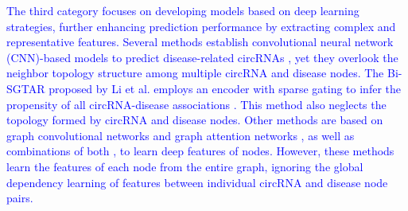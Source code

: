 \documentclass{bioinfo}
\begin{document}
\begin{methods}
\textcolor{blue}{The third category focuses on developing models based on deep learning strategies, further enhancing prediction performance by extracting complex and representative features. Several methods establish convolutional neural network (CNN)-based models to predict disease-related circRNAs \cite{tian2024mamlcda, wang2020efficient, lu2020improving}, yet they overlook the neighbor topology structure among multiple circRNA and disease nodes. The Bi-SGTAR proposed by Li et al. employs an encoder with sparse gating to infer the propensity of all circRNA-disease associations \cite{li2024bi}. This method also neglects the topology formed by circRNA and disease nodes. Other methods are based on graph convolutional networks \cite{shang2024sgfccda, liu2023mpclcda, wu2022mdgf} and graph attention networks \cite{wu2023mlngcf}, as well as combinations of both \cite{dai2022graphcda}, to learn deep features of nodes. However, these methods learn the features of each node from the entire graph, ignoring the global dependency learning of features between individual circRNA and disease node pairs.}


\end{methods}
\end{document}
